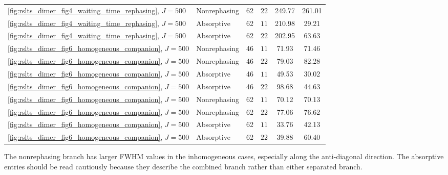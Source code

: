 \begin{table}[htbp]
\begin{tabular}{@{}llcccc@{}}
        \autoref{fig:rslts_dimer_fig4_waiting_time_rephasing}, $J=500$ & Nonrephasing & 62 & $22$ & 249.77 & 261.01 \\
        \autoref{fig:rslts_dimer_fig4_waiting_time_rephasing}, $J=500$ & Absorptive & 62 & $11$ & 210.98 & 29.21 \\
        \autoref{fig:rslts_dimer_fig4_waiting_time_rephasing}, $J=500$ & Absorptive & 62 & $22$ & 202.95 & 63.63 \\
        \autoref{fig:rslts_dimer_fig6_homogeneous_companion}, $J=500$ & Nonrephasing & 46 & $11$ & 71.93 & 71.46 \\
        \autoref{fig:rslts_dimer_fig6_homogeneous_companion}, $J=500$ & Nonrephasing & 46 & $22$ & 79.03 & 82.28 \\
        \autoref{fig:rslts_dimer_fig6_homogeneous_companion}, $J=500$ & Absorptive & 46 & $11$ & 49.53 & 30.02 \\
        \autoref{fig:rslts_dimer_fig6_homogeneous_companion}, $J=500$ & Absorptive & 46 & $22$ & 98.68 & 44.63 \\
        \autoref{fig:rslts_dimer_fig6_homogeneous_companion}, $J=500$ & Nonrephasing & 62 & $11$ & 70.12 & 70.13 \\
        \autoref{fig:rslts_dimer_fig6_homogeneous_companion}, $J=500$ & Nonrephasing & 62 & $22$ & 77.06 & 76.62 \\
        \autoref{fig:rslts_dimer_fig6_homogeneous_companion}, $J=500$ & Absorptive & 62 & $11$ & 33.76 & 42.13 \\
        \autoref{fig:rslts_dimer_fig6_homogeneous_companion}, $J=500$ & Absorptive & 62 & $22$ & 39.88 & 60.40 \\
        \bottomrule
    \end{tabular}
\end{table}

The nonrephasing branch has larger FWHM values in the inhomogeneous cases,
especially along the anti-diagonal direction. The absorptive entries should be
read cautiously because they describe the combined branch rather than either
separated branch.

